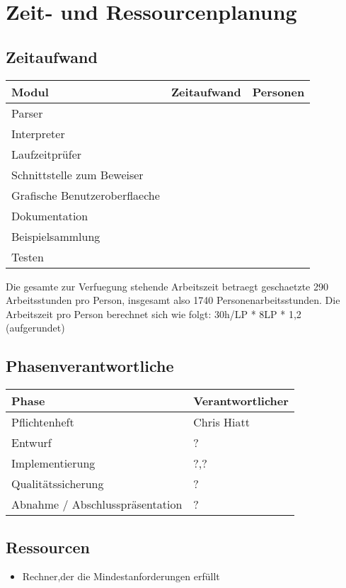 \section{Zeit- und Ressourcenplanung}%

\subsection{Zeitaufwand}%

  \begin{tabular}{| l | l | l | }
    \hline
    Modul & Zeitaufwand & Personen \\ \hline
    Parser &  &  \\ \hline
    Interpreter &  &  \\ \hline
    Laufzeitprüfer &  &  \\ \hline
    Schnittstelle zum Beweiser &  &  \\ \hline
    Grafische Benutzeroberflaeche &  &  \\ \hline
    Dokumentation &  &  \\ \hline
    Beispielsammlung &  &  \\ \hline
    Testen &  &  \\ \hline
    \hline
  \end{tabular}

Die gesamte zur Verfuegung stehende Arbeitszeit betraegt geschaetzte 290 Arbeitsstunden pro Person, insgesamt also 1740 Personenarbeitsstunden.
Die Arbeitszeit pro Person berechnet sich wie folgt: 30h/LP * 8LP * 1,2 (aufgerundet)

\subsection{Phasenverantwortliche}%

  \begin{tabular}{| l | l | }
    \hline
    Phase & Verantwortlicher \\ \hline
    Pflichtenheft & Chris Hiatt \\ \hline
    Entwurf & ? \\ \hline
    Implementierung & ?,? \\ \hline
    Qualitätssicherung & ? \\ \hline
    Abnahme / Abschlusspräsentation & ? \\ \hline
    \hline
  \end{tabular}

\subsection{Ressourcen}%

\begin{itemize}%
    \item Rechner,der die Mindestanforderungen erfüllt
\end{itemize}%
